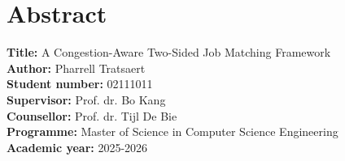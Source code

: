 \chapter*{Abstract}




\textbf{Title:} A Congestion-Aware Two-Sided Job Matching Framework\\
\textbf{Author:} Pharrell Tratsaert\\
\textbf{Student number:} 02111011\\
\textbf{Supervisor:} Prof. dr. Bo Kang\\
\textbf{Counsellor:} Prof. dr. Tijl De Bie\\
\textbf{Programme:} Master of Science in Computer Science Engineering\\
\textbf{Academic year:} 2025-2026
\bigskip
\bigskip

